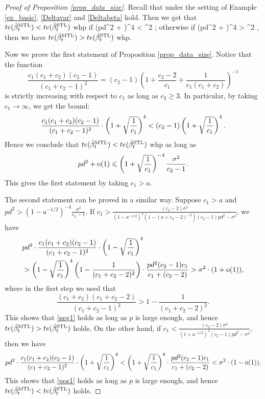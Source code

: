 \begin{proof}[Proof of Proposition \ref{prop_data_size}]
Recall that under the setting of Example \ref{ex_basic}, \eqref{Deltavar} and \eqref{Deltabeta} hold.  Then we get that $te(\hat{\beta}_t^{\text{MTL}})< te(\hat{\beta}_t^{\text{STL}})$ whp if
\be\label{pos1}\left(pd^2  +  \right)^4 <  \sigma^2 ;\ee
otherwise if
\be\label{neg1}\left(pd^2  +  \right)^4 >  \sigma^2 ,\ee
then we have $te(\hat{\beta}_t^{\text{MTL}})> te(\hat{\beta}_t^{\text{STL}})$ whp.

Now we prove the first statement of Proposition \ref{prop_data_size}. Notice that the function
$$ \frac{c_1(c_1+c_2)(c_2-1)}{(c_1+c_2-1)^2} =(c_2-1) \left(1 +\frac{c_2-2}{c_1}+\frac{1}{c_1(c_1+c_2)}\right)^{-1} $$
is strictly increasing with respect to $c_1$ as long as $c_2\ge 3$. In particular, by taking $c_1\to \infty$, we get the bound:
$$\frac{c_1(c_1+c_2)(c_2-1)}{(c_1+c_2-1)^2} \cdot \left({1 + \sqrt{\frac{1}{c_1}}}\right)^4 <  (c_2-1) \left({1 + \sqrt{\frac{1}{c_1}}}\right)^4.$$
 Hence we conclude that $te(\hat{\beta}_t^{\text{MTL}}) < te(\hat{\beta}_t^{\text{STL}})$ whp as long as 
 $$pd^2 +\operatorname{o}(1) \leqslant \left({1 + \sqrt{\frac{1}{c_1}}}\right)^{-4}\frac{\sigma^2}{c_2-1} .$$ 
 This gives the first statement by taking $c_1 > a$. 

The second statement can be proved in a similar way. Suppose $c_1 > a$ and 
$pd^2 > (1 - a^{-1/2})^{-4}\frac{\sigma^2}{c_2-1}$. If $c_1 > \frac{(c_2-2) \sigma^2}{(1-a^{-1/2})^4(1-(a+c_2-2)^{-2})(c_2 - 1) pd^2 - \sigma^2}$, we have
\begin{align*}
 & pd^2 \cdot \frac{c_1(c_1+c_2)(c_2-1)}{(c_1+c_2-1)^2}  \cdot \left({1 - \sqrt{\frac{1}{c_1}}}\right)^4  \\
 &>  \left({1 - \sqrt{\frac{1}{c_1}}}\right)^4 \left( 1-\frac{1}{(c_1+c_2-2)^2}\right)\cdot \frac{ pd^2(c_2-1) c_1 }{c_1+(c_2-2)}  >\sigma^2\cdot (1+\operatorname{o}(1)) , 
 \end{align*}
 where in the first step we used that 
 $$ \frac{(c_1+c_2)(c_1+c_2-2)}{(c_1+c_2-1)^2}   > 1-\frac{1}{(c_1+c_2-2)^2}.$$
This shows that \eqref{neg1} holds as long as $p$ is large enough, and hence $te(\hat{\beta}_t^{\text{MTL}})> te(\hat{\beta}_t^{\text{STL}})$ holds. On the other hand, if $c_1 < \frac{(c_2-2)\sigma^2}{(1+a^{-1/2})^4(c_2 - 1) pd^2 - \sigma^2}$, then we have 
 \begin{align*}
 pd^2 \cdot \frac{c_1(c_1+c_2)(c_2-1)}{(c_1+c_2-1)^2}  \cdot \left({1 + \sqrt{\frac{1}{c_1}}}\right)^4 < \left({1 + \sqrt{\frac{1}{c_1}}}\right)^4 \cdot \frac{pd^2(c_2-1) c_1 }{c_1+(c_2-2)}  < \sigma^2\cdot (1-\operatorname{o}(1)).
 \end{align*}
 This shows that \eqref{pos1} holds as long as $p$ is large enough, and hence $te(\hat{\beta}_t^{\text{MTL}})< te(\hat{\beta}_t^{\text{STL}})$ holds.
 \end{proof}


